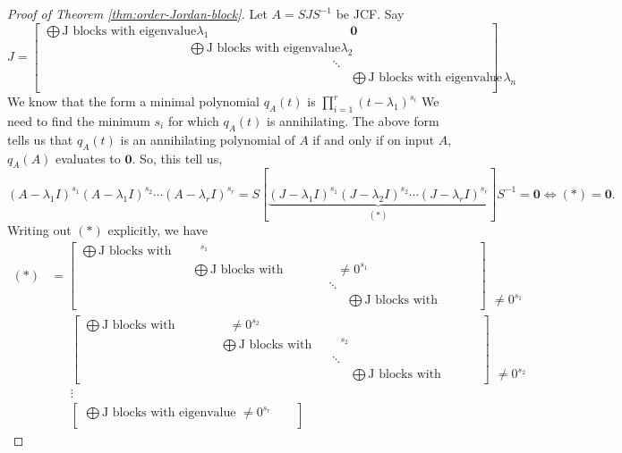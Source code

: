 \begin{proof}[Proof of Theorem \ref{thm:order-Jordan-block}]
Let $A = SJS^{-1}$ be JCF. Say
$$
J = \begin{bmatrix}
\bigoplus \text{J blocks with eigenvalue } \lambda_1 & & & \mathbf{0} \\
& \bigoplus \text{J blocks with eigenvalue } \lambda_2 & & \\
& & \ddots & \\
& & & \bigoplus \text{J blocks with eigenvalue } \lambda_n \\
\end{bmatrix}
$$
We know that the form a minimal polynomial $q_A(t)$ is $\prod_{i=1}^r (t-\lambda_1)^{s_i}$
We need to find the minimum $s_i$ for which $q_A(t)$ is annihilating. The above form tells us that $q_A(t)$ is an annihilating polynomial of $A$ if and only if on input $A$, $q_A(A)$ evaluates to $\mathbf{0}$. So, this tell us,
$$
(A-\lambda_1 I)^{s_1}(A-\lambda_1 I)^{s_2} \cdots (A-\lambda_r I)^{s_r} = S[\underbrace{(J-\lambda_1 I)^{s_1} (J-\lambda_2 I)^{s_2} \cdots (J-\lambda_r I)^{s_r}}_{(*)}]S^{-1} = \mathbf{0} \Longleftrightarrow (*) = \mathbf{0}.
$$
Writing out $(*)$ explicitly, we have
\begin{align*}
    (*) &= \begin{bmatrix}
            \bigoplus \text{J blocks with eigenvalue 0}^{s_1} & & & \\
            & \bigoplus \text{J blocks with eigenvalue }\not= 0^{s_1} & & \\
            & & \ddots & \\
            & & & \bigoplus \text{J blocks with eigenvalue }\not= 0^{s_1}
            \end{bmatrix} \\
        &\phantom{=.} 
            \begin{bmatrix}
            \bigoplus \text{J blocks with eigenvalue }\not= 0^{s_2} & & & \\
            & \bigoplus \text{J blocks with eigenvalue 0}^{s_2} & & \\
            & & \ddots & \\
            & & & \bigoplus \text{J blocks with eigenvalue }\not= 0^{s_2}
            \end{bmatrix} \\
        &\phantom{=.} \vdots \\
        &\phantom{=.}
            \begin{bmatrix}
            \bigoplus \text{J blocks with eigenvalue }\not= 0^{s_r} && \\

\end{bmatrix}
\end{align*}
\end{proof}
